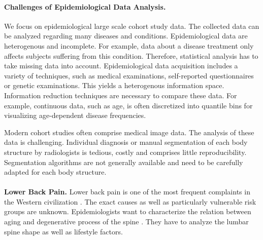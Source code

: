 \documentclass[a4paper,twoside]{style/article}
\begin{document}
\paragraph{Challenges of Epidemiological Data Analysis.}
We focus on epidemiological large scale cohort study data.
The collected data can be analyzed regarding many diseases and conditions.
Epidemiological data are heterogenous and incomplete.
For example, data about a disease treatment only affects subjects suffering from this condition.
Therefore, statistical analysis has to take missing data into account.
Epidemiological data acquisition includes a variety of techniques, such as medical examinations, self-reported questionnaires or genetic examinations.
This yields a heterogenous information space.
Information reduction techniques are necessary to compare these data.
For example, continuous data, such as age, is often discretized into quantile bins for visualizing age-dependent disease frequencies.

Modern cohort studies often comprise medical image data.
The analysis of these data is challenging.
Individual diagnosis or manual segmentation of each body structure by radiologists is tedious, costly and comprises little reproducibility.
Segmentation algorithms are not generally available and need to be carefully adapted for each body structure.
\\\\
\noindent \textbf{Lower Back Pain.}
Lower back pain is one of the most frequent complaints in the Western civilization \cite{Hoy2010}.
The exact causes as well as particularly vulnerable risk groups are unknown.
Epidemiologists want to characterize the relation between aging and degenerative process of the spine \cite{Szpalski2005}.
They have to analyze the lumbar spine shape as well as lifestyle factors.
\end{document}
